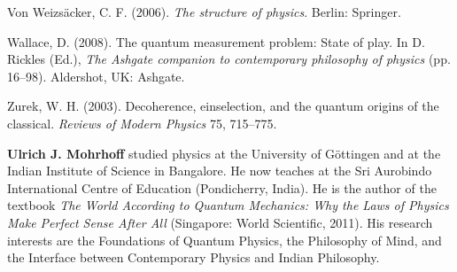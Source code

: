\begin{thebibliography}{99}
Von Weizs\"acker, C. F. (2006). \emph{The structure of physics}. Berlin: Springer. 

Wallace, D. (2008). The quantum measurement problem: State of play. In D. Rickles (Ed.), \emph{The Ashgate companion to contemporary philosophy of physics} (pp. 16--98). Aldershot, UK: Ashgate.

Zurek, W. H. (2003). Decoherence, einselection, and the quantum origins of the classical. \emph{Reviews of Modern Physics} 75, 715--775. 
\end{thebibliography}

\bigskip\noindent\textbf{Ulrich J. Mohrhoff} studied physics at the University of G\"ottingen and at the Indian Institute of Science in Bangalore. He now teaches at the Sri Aurobindo International Centre of Education (Pondicherry, India). He is the author of the textbook \emph{The World According to Quantum Mechanics: Why the Laws of Physics Make Perfect Sense After All} (Singapore: World Scientific, 2011). His research interests are the Foundations of Quantum Physics, the Philosophy of Mind, and the Interface between Contemporary Physics and Indian Philosophy.





 